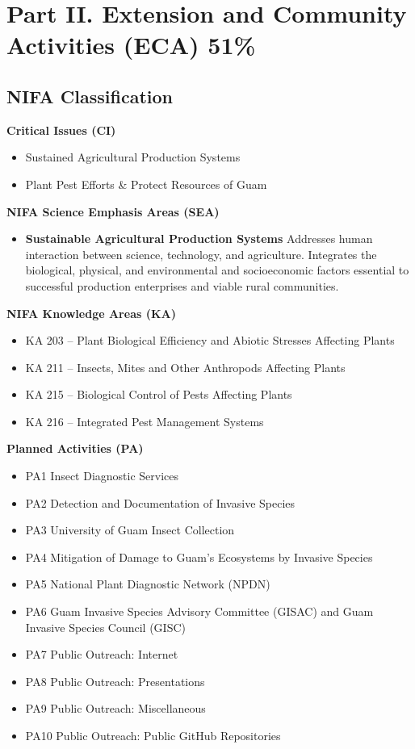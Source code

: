 \section{Part II. Extension and Community Activities (ECA) 51\%}

\subsection{NIFA Classification}

\textbf{Critical Issues (CI)}
\begin{itemize}
\item Sustained Agricultural Production Systems
\item Plant Pest Efforts \& Protect Resources of Guam
\end{itemize}

\textbf{NIFA Science Emphasis Areas (SEA)}
\begin{itemize}
\item \textbf{Sustainable Agricultural Production Systems} Addresses human interaction between science, technology, and agriculture. Integrates the biological, physical, and environmental and socioeconomic factors essential to successful production enterprises and viable rural communities. 
\end{itemize}

\textbf{NIFA Knowledge Areas (KA)}
\begin{itemize}
\item KA 203 – Plant Biological Efficiency and Abiotic Stresses Affecting Plants
\item KA 211 – Insects, Mites and Other Anthropods Affecting Plants
\item KA 215 – Biological Control of Pests Affecting Plants
\item KA 216 – Integrated Pest Management Systems
\end{itemize}

\textbf{Planned Activities (PA)}
\begin{itemize}
\item PA1 Insect Diagnostic Services
\item PA2 Detection and Documentation of Invasive Species
\item PA3 University of Guam Insect Collection
\item PA4 Mitigation of Damage to Guam's Ecosystems by Invasive Species
\item PA5 National Plant Diagnostic Network (NPDN)
\item PA6 Guam Invasive Species Advisory Committee (GISAC) and Guam Invasive Species Council (GISC)
\item PA7 Public Outreach: Internet
\item PA8 Public Outreach: Presentations
\item PA9 Public Outreach: Miscellaneous
\item PA10 Public Outreach: Public GitHub Repositories
\end{itemize}


